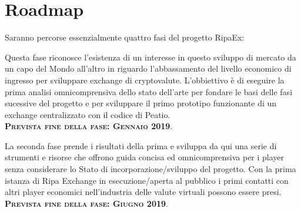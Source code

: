 \documentclass[11pt,fleqn,oneside]{book} %
\begin{document}
\pagebreak
\section{Roadmap}
Saranno percorse essenzialmente quattro fasi del progetto RipaEx:\\

\begin{center}
\begin{tcolorbox}[roadmapBox,
	title=\textbf{\textsc{Finanziamneto del progetto: XPX presale e RIPA TEC (WP2)}}]

	Questa fase riconosce l'esistenza di un interesse in questo sviluppo di mercato
	da un capo del Mondo all'altro in riguardo l'abbassamento del livello economico di ingresso
	per sviluppare exchange di cryptovalute.
	L'obbiettivo è di eseguire la prima analisi omnicomprensiva dello stato dell'arte per fondare
	le basi delle fasi sucessive del progetto e per sviluppare il primo prototipo
	funzionante di un exchange centralizzato con il codice di Peatio.\\
	\vspace{1cm}
	\centering\textbf{\textsc{Prevista fine della fase: Gennaio 2019}}.
\end{tcolorbox}

\resizebox{0.05\textwidth}{26pt}{$\Downarrow$}

\begin{tcolorbox}[roadmapBox,
	title=\textbf{\textsc{Apertura del primo exchange e sviluppo di strumenti e risorse (WP3)}}]

	La seconda fase prende i risultati della prima e sviluppa da qui
	una serie di strumenti e risorse che offrono guida concisa ed omnicomprensiva per 
	i player senza considerare lo Stato di incorporazione/sviluppo del progetto. Con la prima
	istanza di Ripa Exchange in esecuzione/aperta al pubblico i primi contatti con altri player economici
	nell'industria delle valute virtuali possono essere presi.\\
	\vspace{1cm}
	\centering\textbf{\textsc{Prevista fine della fase: Giugno 2019}}.
\end{tcolorbox}

\resizebox{0.05\textwidth}{26pt}{$\Downarrow$}


\end{center}
\end{document}
